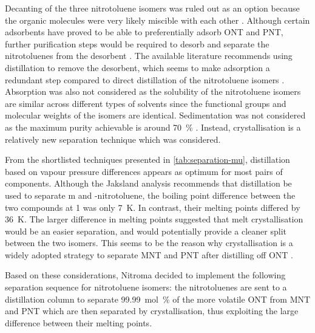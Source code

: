 Decanting of the three nitrotoluene isomers was ruled out as an option because the organic molecules were very likely miscible with each other \cite{merck_solvent_2021}. Although certain adsorbents have proved to be able to preferentially adsorb ONT and PNT, further purification steps would be required to desorb and separate the nitrotoluenes from the desorbent \cite{zhao_new_2016}. The available literature recommends using distillation to remove the desorbent, which seems to make adsorption a redundant step compared to direct distillation of the nitrotoluene isomers \cite{zinnen_ep0181106a2_1984}. Absorption was also not considered as the solubility of the nitrotoluene isomers are similar across different types of solvents since the functional groups and molecular weights of the isomers are identical. Sedimentation was not considered as the maximum purity achievable is around \SI{70}{\percent} \cite{seider_product_2009}. Instead, crystallisation is a relatively new separation technique which was considered. 

From the shortlisted techniques presented in \cref{tab:separation-mu}, distillation based on vapour pressure differences appears as optimum for most pairs of components. Although the Jaksland analysis recommends that distillation be used to separate m and \para-nitrotoluene, the boiling point difference between the two compounds at \SI{1}{\atm} was only \SI{7}{\K}. In contrast, their melting points differed by \SI{36}{\K}. The larger difference in melting points suggested that melt crystallisation would be an easier separation, and would potentially provide a cleaner split between the two isomers. This seems to be the reason why crystallisation is a widely adopted strategy to separate MNT and PNT after distilling off ONT \cite{weiland_purification_1931,european_chemical_agency_background_2010}. 

Based on these considerations, Nitroma decided to implement the following separation sequence for nitrotoluene isomers: the nitrotoluenes are sent to a distillation column to separate \SI{99.99}{mol\percent} of the more volatile ONT from MNT and PNT which are then separated by crystallisation, thus exploiting the large difference between their melting points.


